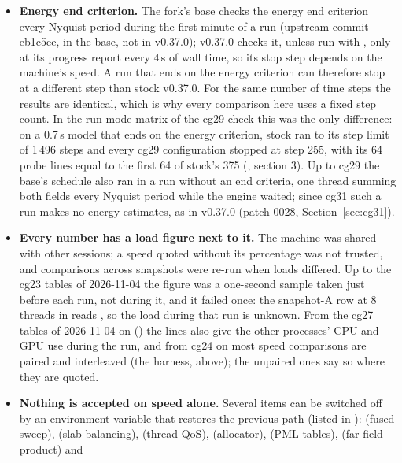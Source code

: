 \begin{itemize}
  peak. The legacy loop is kept behind  and is itself bit-identical (also checked in
  that file).
\item \textbf{Energy end criterion.} The fork's base checks the energy end criterion every Nyquist period during the
  first minute of a run (upstream commit eb1c5ee, in the  base, not in v0.37.0); v0.37.0 checks it,
  unless run with , only at its progress report every 4\,s of wall time, so its stop step
  depends on the machine's speed. A run that ends on the energy criterion can therefore stop at a different step than
  stock v0.37.0. For the same number of time steps the results are identical, which is why every comparison here uses
  a fixed step count. In the run-mode matrix of the cg29 check this was the only difference: on a 0.7\,s model that
  ends on the energy criterion, stock ran to its step limit of 1\,496 steps and every cg29 configuration stopped at
  step 255, with its 64 probe lines equal to the first 64 of stock's 375
  (, section 3). Up to cg29 the base's schedule also ran in a run
  without an end criteria, one thread summing both fields every Nyquist period while the engine waited; since cg31
  such a run makes no energy estimates, as in v0.37.0 (patch 0028, Section~\ref{sec:cg31}).
\item \textbf{Every number has a load figure next to it.} The machine was shared with other sessions; a speed quoted
  without its  percentage was not trusted, and comparisons across snapshots were re-run when loads
  differed. Up to the cg23 tables of 2026-11-04 the figure was a one-second sample taken just before each run, not
  during it, and it failed once: the snapshot-A row at 8 threads in  reads
  , so the load during that run is unknown. From the cg27 tables of 2026-11-04 on
  () the lines also give the other processes' CPU and GPU use during the run, and from cg24 on
  most speed comparisons are paired and interleaved (the harness, above); the unpaired ones say so where they are
  quoted.
\item \textbf{Nothing is accepted on speed alone.} Several items can be switched off by an environment variable that
  restores the previous path (listed in ):  (fused sweep),
   (slab balancing),  (thread QoS), 
  (allocator),  (PML tables),  (far-field product) and

\end{itemize}
